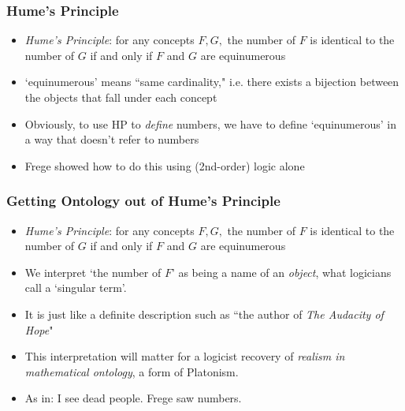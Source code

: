 \begin{frame}
\frametitle{Hume's Principle}


\begin{itemize}[<+->]

\item \emph{Hume's Principle}: for any concepts $F, G,$ the number of $F $ is identical to the number of $G $ if and only if $F$ and $G$ are equinumerous

\item `equinumerous' means ``same cardinality," i.e. there exists a bijection between the objects that fall under each concept 

\item Obviously, to use HP to \textit{define} numbers, we have to define `equinumerous' in a way that doesn't refer to numbers

\item Frege showed how to do this using (2nd-order) logic alone




\end{itemize}
\end{frame}

\begin{frame}
\frametitle{Getting Ontology out of Hume's Principle}

\begin{itemize}[<+->]

\item \emph{Hume's Principle}: for any concepts $F, G,$ the number of $F $ is identical to the number of $G $ if and only if $F$ and $G$ are equinumerous

\item We interpret `the number of $F$' as being a name of an \textit{object}, what logicians call a `singular term'. 
\item[] It is just like a definite description such as ``the author of \textit{The Audacity of Hope}"

\item This interpretation will matter for a logicist recovery of \textit{realism in mathematical ontology}, a form of Platonism. 

\item As in: I see dead people. Frege saw numbers. 

\end{itemize}
\end{frame}

